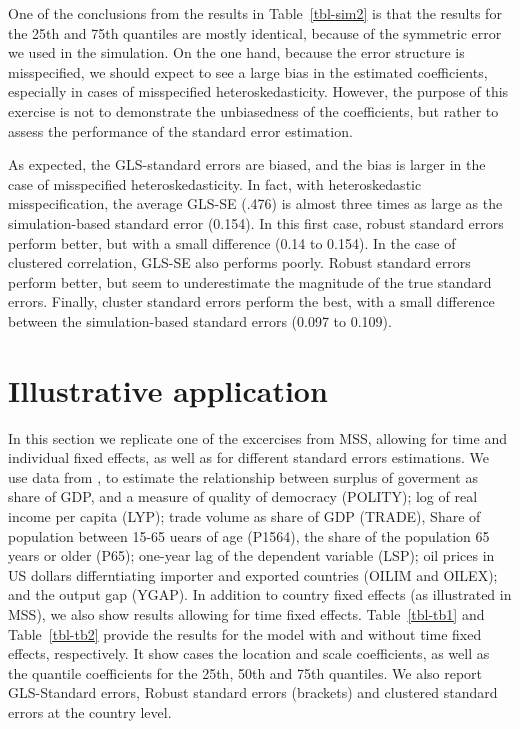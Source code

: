 \documentclass[
  authoryear,
  review,
  1p]{elsarticle}
\begin{document}
One of the conclusions from the results in Table~\ref{tbl-sim2} is that
the results for the 25th and 75th quantiles are mostly identical,
because of the symmetric error we used in the simulation. On the one
hand, because the error structure is misspecified, we should expect to
see a large bias in the estimated coefficients, especially in cases of
misspecified heteroskedasticity. However, the purpose of this exercise
is not to demonstrate the unbiasedness of the coefficients, but rather
to assess the performance of the standard error estimation.

As expected, the GLS-standard errors are biased, and the bias is larger
in the case of misspecified heteroskedasticity. In fact, with
heteroskedastic misspecification, the average GLS-SE (.476) is almost
three times as large as the simulation-based standard error (0.154). In
this first case, robust standard errors perform better, but with a small
difference (0.14 to 0.154). In the case of clustered correlation, GLS-SE
also performs poorly. Robust standard errors perform better, but seem to
underestimate the magnitude of the true standard errors. Finally,
cluster standard errors perform the best, with a small difference
between the simulation-based standard errors (0.097 to 0.109).

\hypertarget{illustrative-application}{%
\section{Illustrative application}\label{illustrative-application}}

In this section we replicate one of the excercises from MSS, allowing
for time and individual fixed effects, as well as for different standard
errors estimations. We use data from \citet{persson_economic_2005}, to
estimate the relationship between surplus of goverment as share of GDP,
and a measure of quality of democracy (POLITY); log of real income per
capita (LYP); trade volume as share of GDP (TRADE), Share of population
between 15-65 uears of age (P1564), the share of the population 65 years
or older (P65); one-year lag of the dependent variable (LSP); oil prices
in US dollars differntiating importer and exported countries (OILIM and
OILEX); and the output gap (YGAP). In addition to country fixed effects
(as illustrated in MSS), we also show results allowing for time fixed
effects. Table~\ref{tbl-tb1} and Table~\ref{tbl-tb2} provide the results
for the model with and without time fixed effects, respectively. It show
cases the location and scale coefficients, as well as the quantile
coefficients for the 25th, 50th and 75th quantiles. We also report
GLS-Standard errors, Robust standard errors (brackets) and clustered
standard errors at the country level.
\end{document}
